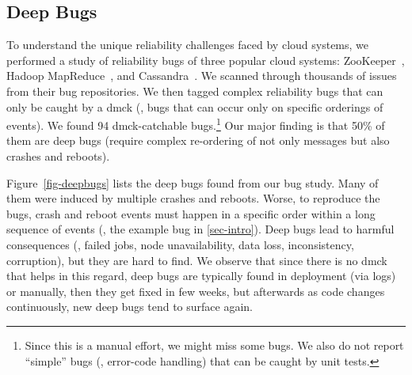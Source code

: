 

\subsection{Deep Bugs}
\label{mot-deep}


\fi



To understand the unique reliability challenges faced by cloud
systems, we performed a study of reliability bugs of three popular
cloud systems: ZooKeeper~\cite{Hunt+10-ZooKeeperPaper}, Hadoop
MapReduce~\cite{Kumar+13-Yarn}, and
Cassandra~\cite{Lakshman+09-Cassandra}.  We scanned through thousands
of issues from their bug repositories.  We then tagged complex
reliability bugs that can only be caught by a dmck (\ie, bugs that can
occur only on specific orderings of events).  We found 94
dmck-catchable bugs.\footnote[1]{Since this is a manual effort, we
  might miss some bugs.  We also do not report ``simple'' bugs (\eg,
  error-code handling) that can be caught by unit tests.}  Our major
finding is that 50\% of them are deep bugs (require complex
re-ordering of not only messages but also crashes and reboots).



Figure~\ref{fig-deepbugs} lists the deep bugs found from our bug
study.  Many of them were induced by multiple crashes and reboots.
Worse, to reproduce the bugs, crash and reboot events must happen in a
specific order within a long sequence of events (\eg, the example bug
in \sec\ref{sec-intro}).  Deep bugs lead to harmful consequences (\eg,
failed jobs, node unavailability, data loss, inconsistency,
corruption), but they are hard to find.  We observe that since there
is no dmck that helps in this regard, deep bugs are typically found in
deployment (via logs) or manually, then they get fixed in few
weeks, but afterwards as code changes continuously, new deep bugs
tend to surface again.

